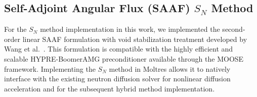 \subsection{Self-Adjoint Angular Flux (SAAF) $S_N$ Method} \label{sec:saaf}

For the $S_N$ method implementation in this work, we implemented the second-order linear \gls{SAAF}
formulation with void stabilization treatment developed by Wang et al.\ \cite{wang_diffusion_2014}.
This formulation is compatible with the highly efficient and scalable HYPRE-BoomerAMG
preconditioner \cite{hypre_hypre_2022} available through
the \gls{MOOSE} framework. Implementing the $S_N$ method in Moltres allows it to natively interface
with the existing neutron diffusion solver for nonlinear diffusion acceleration and for the
subsequent hybrid method implementation.

